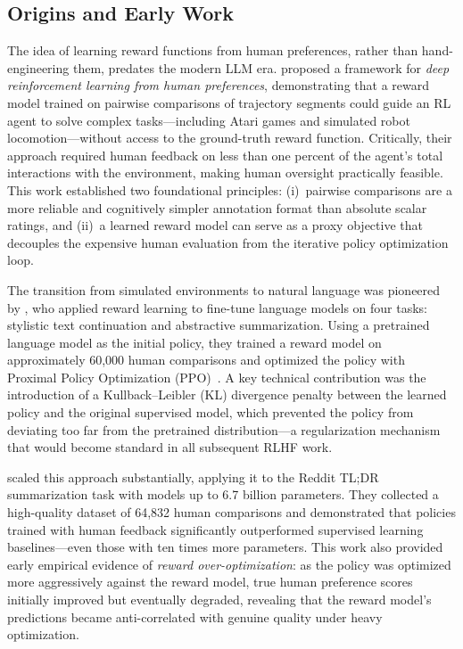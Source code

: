 \documentclass[12pt,a4paper]{report}
\begin{document}
\subsection{Origins and Early Work}

The idea of learning reward functions from human preferences, rather than hand-engineering them, predates the modern LLM era. \cite{christiano2017deep} proposed a framework for \emph{deep reinforcement learning from human preferences}, demonstrating that a reward model trained on pairwise comparisons of trajectory segments could guide an RL agent to solve complex tasks---including Atari games and simulated robot locomotion---without access to the ground-truth reward function. Critically, their approach required human feedback on less than one percent of the agent's total interactions with the environment, making human oversight practically feasible. This work established two foundational principles: (i)~pairwise comparisons are a more reliable and cognitively simpler annotation format than absolute scalar ratings, and (ii)~a learned reward model can serve as a proxy objective that decouples the expensive human evaluation from the iterative policy optimization loop.

The transition from simulated environments to natural language was pioneered by \cite{ziegler2019finetuning}, who applied reward learning to fine-tune language models on four tasks: stylistic text continuation and abstractive summarization. Using a pretrained language model as the initial policy, they trained a reward model on approximately 60,000 human comparisons and optimized the policy with Proximal Policy Optimization (PPO)~\cite{schulman2017ppo}. A key technical contribution was the introduction of a Kullback--Leibler (KL) divergence penalty between the learned policy and the original supervised model, which prevented the policy from deviating too far from the pretrained distribution---a regularization mechanism that would become standard in all subsequent RLHF work.

\cite{stiennon2020learning} scaled this approach substantially, applying it to the Reddit TL;DR summarization task with models up to 6.7 billion parameters. They collected a high-quality dataset of 64,832 human comparisons and demonstrated that policies trained with human feedback significantly outperformed supervised learning baselines---even those with ten times more parameters. This work also provided early empirical evidence of \emph{reward over-optimization}: as the policy was optimized more aggressively against the reward model, true human preference scores initially improved but eventually degraded, revealing that the reward model's predictions became anti-correlated with genuine quality under heavy optimization.
\end{document}
